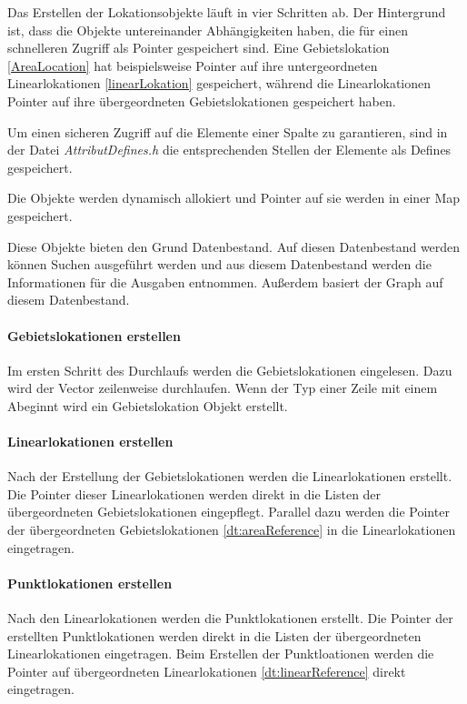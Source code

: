 \documentclass[12pt, a4paper, ngerman]{article}
\begin{document}
Das Erstellen der Lokationsobjekte läuft in vier Schritten ab. Der Hintergrund ist, dass die Objekte untereinander Abhängigkeiten haben, die für einen schnelleren Zugriff als Pointer gespeichert sind. Eine Gebietslokation  \ref{AreaLocation} hat beispielsweise Pointer auf ihre untergeordneten Linearlokationen \ref{linearLokation} gespeichert, während die Linearlokationen Pointer auf ihre übergeordneten Gebietslokationen gespeichert haben.

Um einen sicheren Zugriff auf die Elemente einer Spalte zu garantieren, sind in der Datei \textit{AttributDefines.h} die entsprechenden Stellen der Elemente als Defines gespeichert.

Die Objekte werden dynamisch allokiert und Pointer auf sie werden in einer Map gespeichert.  

Diese Objekte bieten den Grund Datenbestand. Auf diesen Datenbestand werden können Suchen ausgeführt werden und aus diesem Datenbestand werden die Informationen für die Ausgaben entnommen. Außerdem basiert der Graph auf diesem Datenbestand.

\paragraph{Gebietslokationen erstellen}
Im ersten Schritt des Durchlaufs werden die Gebietslokationen eingelesen. Dazu wird der Vector zeilenweise durchlaufen. Wenn der Typ einer Zeile mit einem \glqq A\grqq  beginnt wird ein Gebietslokation Objekt erstellt.

\paragraph{Linearlokationen erstellen}
Nach der Erstellung der Gebietslokationen werden die Linearlokationen erstellt. Die Pointer dieser Linearlokationen werden direkt in die Listen der übergeordneten Gebietslokationen eingepflegt. Parallel dazu werden die Pointer der übergeordneten Gebietslokationen \ref{dt:areaReference} in die Linearlokationen eingetragen.

\paragraph{Punktlokationen erstellen}
Nach den Linearlokationen werden die Punktlokationen erstellt. Die Pointer der erstellten Punktlokationen werden direkt in die Listen der übergeordneten Linearlokationen eingetragen. Beim Erstellen der Punktloationen werden die Pointer auf übergeordneten Linearlokationen \ref{dt:linearReference} direkt eingetragen.
\end{document}
